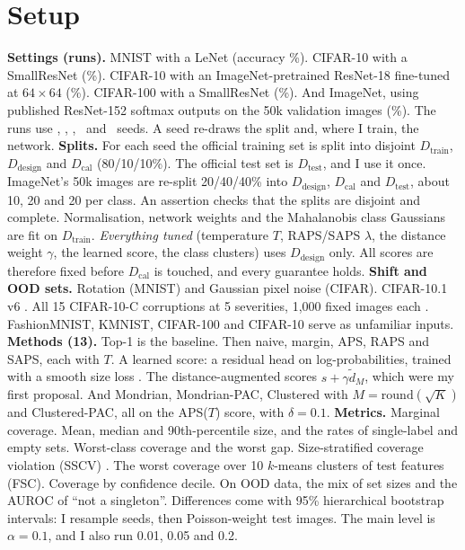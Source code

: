 \documentclass{article}
\newcommand{\dcal}{D_\text{cal}}
\newcommand{\dtest}{D_\text{test}}
\newcommand{\ddes}{D_\text{design}}
\begin{document}
\section{Setup}\label{sec:setup}
\textbf{Settings (runs).} MNIST with a LeNet \citep{lecun1998gradient} (accuracy \AccMNIST\%). CIFAR-10 with a SmallResNet
\citep{krizhevsky2009learning,he2016deep} (\AccCTen\%). CIFAR-10 with an ImageNet-pretrained ResNet-18 fine-tuned at $64\times64$
(\AccCTenR\%). CIFAR-100 with a SmallResNet (\AccCHun\%). And ImageNet, using published ResNet-152 softmax outputs on the 50k
validation images \citep{deng2009imagenet,angelopoulos2021uncertainty} (\AccINet\%). The runs use \SeedsMNIST, \SeedsCTen, \SeedsCTenR,
\SeedsCHun\ and \SeedsINet\ seeds. A seed re-draws the split and, where I train, the network.
\textbf{Splits.} For each seed the official training set is split into disjoint $D_\text{train}$, $\ddes$ and $\dcal$ (80/10/10\%).
The official test set is $\dtest$, and I use it once. ImageNet's 50k images are re-split 20/40/40\% into $\ddes$, $\dcal$ and
$\dtest$, about 10, 20 and 20 per class. An assertion checks that the splits are disjoint and complete. Normalisation, network weights
and the Mahalanobis class Gaussians are fit on $D_\text{train}$. \emph{Everything tuned} (temperature $T$, RAPS/SAPS $\lambda$, the
distance weight $\gamma$, the learned score, the class clusters) uses $\ddes$ only. All scores are therefore fixed before $\dcal$ is
touched, and every guarantee holds.
\textbf{Shift and OOD sets.} Rotation (MNIST) and Gaussian pixel noise (CIFAR). CIFAR-10.1 v6 \citep{recht2018cifar}. All 15
CIFAR-10-C corruptions at 5 severities, 1{,}000 fixed images each \citep{hendrycks2019benchmarking}. FashionMNIST, KMNIST, CIFAR-100
and CIFAR-10 serve as unfamiliar inputs.
\textbf{Methods (13).} Top-1 is the baseline. Then naive, margin, APS, RAPS and SAPS, each with $T$. A learned score: a residual head
on log-probabilities, trained with a smooth size loss \citep{stutz2022learning}. The distance-augmented scores $s+\gamma\tilde d_M$,
which were my first proposal. And Mondrian, Mondrian-PAC, Clustered \citep{ding2023class} with $M=\mathrm{round}(\sqrt K)$ and
Clustered-PAC, all on the APS($T$) score, with $\delta=0.1$.
\textbf{Metrics.} Marginal coverage. Mean, median and 90th-percentile size, and the rates of single-label and empty sets. Worst-class
coverage and the worst gap. Size-stratified coverage violation (SSCV) \citep{angelopoulos2021uncertainty}. The worst coverage over 10
$k$-means clusters of test features (FSC). Coverage by confidence decile. On OOD data, the mix of set sizes and the AUROC of ``not a
singleton''. Differences come with 95\% hierarchical bootstrap intervals: I resample seeds, then Poisson-weight test images. The main
level is $\alpha=0.1$, and I also run 0.01, 0.05 and 0.2.
\end{document}
